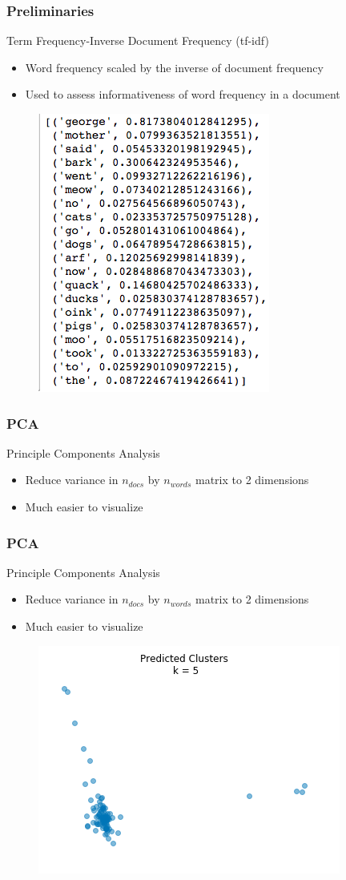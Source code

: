 \documentclass{beamer}
\begin{document}
\begin{frame}
	\frametitle{Preliminaries}
	Term Frequency-Inverse Document Frequency (tf-idf)	\begin{itemize}
		\item Word frequency scaled by the inverse of document frequency
		\item Used to assess informativeness of word frequency in a document
	\end{itemize}
	\begin{figure}
		\includegraphics[width=0.4\linewidth]{tfidf.png}
	\end{figure}
\end{frame}

\begin{frame}
	\frametitle{PCA}
	Principle Components Analysis
	\begin{itemize}
		\item {Reduce variance in $n_{docs}$ by $n_{words}$ matrix to 2 dimensions}
		\item Much easier to visualize
	\end{itemize}
\end{frame}

\begin{frame}
	\frametitle{PCA}
	Principle Components Analysis
	\begin{itemize}
		\item {Reduce variance in $n_{docs}$ by $n_{words}$ matrix to 2 dimensions}
		\item Much easier to visualize
	\end{itemize}
	\begin{figure}
		\includegraphics[width=0.6\linewidth]{PCAviz.png}
	\end{figure}
\end{frame}
\end{document}
